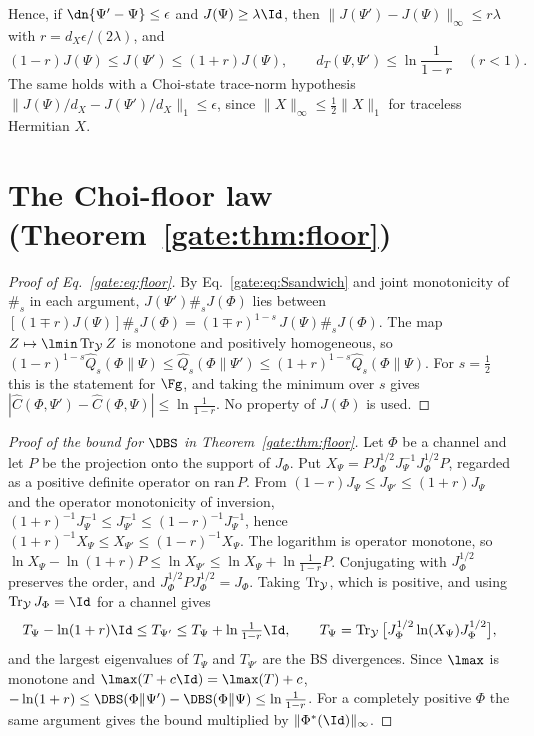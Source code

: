 Hence, if $\dn{\Psi'-\Psi}\le\epsilon$ and $J(\Psi)\ge\lambda\Id$, then $\|J(\Psi')-J(\Psi)\|_\infty\le r\lambda$ with $r=d_X\epsilon/(2\lambda)$, and
\begin{equation}\label{gate:eq:Ssandwich}
(1-r)J(\Psi)\le J(\Psi')\le(1+r)J(\Psi),\qquad d_T(\Psi,\Psi')\le\ln\frac1{1-r}\quad(r<1).
\end{equation}
The same holds with a Choi-state trace-norm hypothesis $\|J(\Psi)/d_X-J(\Psi')/d_X\|_1\le\epsilon$, since $\|X\|_\infty\le\frac12\|X\|_1$ for traceless Hermitian $X$.

\section{\texorpdfstring{The Choi-floor law (Theorem~\ref{gate:thm:floor})}{The Choi-floor law}}\label{gate:sec:floor}

\begin{proof}[Proof of Eq.~\eqref{gate:eq:floor}]
By Eq.~\eqref{gate:eq:Ssandwich} and joint monotonicity of $\#_s$ in each argument, $J(\Psi')\#_sJ(\Phi)$ lies between $[(1\mp r)J(\Psi)]\#_sJ(\Phi)=(1\mp r)^{1-s}\,J(\Psi)\#_sJ(\Phi)$. The map $Z\mapsto\lmin\Tr_{\mathcal Y}Z$ is monotone and positively homogeneous, so $(1-r)^{1-s}\hat Q_s(\Phi\|\Psi)\le\hat Q_s(\Phi\|\Psi')\le(1+r)^{1-s}\hat Q_s(\Phi\|\Psi)$. For $s=\frac12$ this is the statement for $\Fg$, and taking the minimum over $s$ gives $|\hat C(\Phi,\Psi')-\hat C(\Phi,\Psi)|\le\ln\frac1{1-r}$. No property of $J(\Phi)$ is used.
\end{proof}

\begin{proof}[Proof of the bound for $\DBS$ in Theorem~\ref{gate:thm:floor}]
Let $\Phi$ be a channel and let $P$ be the projection onto the support of $J_\Phi$. Put $X_\Psi=P J_\Phi^{1/2}J_\Psi^{-1}J_\Phi^{1/2}P$, regarded as a positive definite operator on $\mathrm{ran}\,P$. From $(1-r)J_\Psi\le J_{\Psi'}\le(1+r)J_\Psi$ and the operator monotonicity of inversion, $(1+r)^{-1}J_\Psi^{-1}\le J_{\Psi'}^{-1}\le(1-r)^{-1}J_\Psi^{-1}$, hence $(1+r)^{-1}X_\Psi\le X_{\Psi'}\le(1-r)^{-1}X_\Psi$. The logarithm is operator monotone, so $\ln X_\Psi-\ln(1+r)P\le\ln X_{\Psi'}\le\ln X_\Psi+\ln\frac1{1-r}P$. Conjugating with $J_\Phi^{1/2}$ preserves the order, and $J_\Phi^{1/2}PJ_\Phi^{1/2}=J_\Phi$. Taking $\operatorname{Tr}_{\mathcal Y}$, which is positive, and using $\Tr_{\mathcal Y}J_\Phi=\Id$ for a channel gives
\begin{equation*}
T_\Psi-\ln(1+r)\Id\le T_{\Psi'}\le T_\Psi+\ln\tfrac1{1-r}\Id,\qquad T_\Psi=\Tr_{\mathcal Y}\big[J_\Phi^{1/2}\ln(X_\Psi)J_\Phi^{1/2}\big],
\end{equation*}
and the largest eigenvalues of $T_\Psi$ and $T_{\Psi'}$ are the BS divergences. Since $\lmax$ is monotone and $\lmax(T+c\Id)=\lmax(T)+c$, $-\ln(1+r)\le\DBS(\Phi\|\Psi')-\DBS(\Phi\|\Psi)\le\ln\frac1{1-r}$. For a completely positive $\Phi$ the same argument gives the bound multiplied by $\|\Phi^*(\Id)\|_\infty$.
\end{proof}

